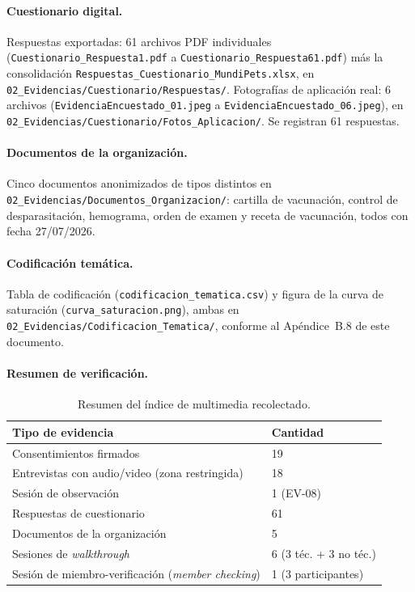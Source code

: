 \documentclass[journal,onecolumn]{IEEEtran}
\begin{document}
	\paragraph{Cuestionario digital.}
	Respuestas exportadas: 61 archivos PDF individuales
	(\texttt{Cuestionario\_Respuesta1.pdf} a
	\texttt{Cuestionario\_Respuesta61.pdf}) más la consolidación
	\texttt{Respuestas\_Cuestionario\_MundiPets.xlsx}, en
	\texttt{02\_Evidencias/Cuestionario/Respuestas/}. Fotografías de aplicación
	real: 6 archivos (\texttt{EvidenciaEncuestado\_01.jpeg} a
	\texttt{EvidenciaEncuestado\_06.jpeg}), en
	\texttt{02\_Evidencias/Cuestionario/Fotos\_Aplicacion/}. Se registran
	61 respuestas.
	
	\paragraph{Documentos de la organización.}
	Cinco documentos anonimizados de tipos distintos en
	\texttt{02\_Evidencias/Documentos\_Organizacion/}: cartilla de vacunación,
	control de desparasitación, hemograma, orden de examen y receta de
	vacunación, todos con fecha 27/07/2026.
	
	\paragraph{Codificación temática.}
	Tabla de codificación (\texttt{codificacion\_tematica.csv}) y figura de la
	curva de saturación (\texttt{curva\_saturacion.png}), ambas en
	\texttt{02\_Evidencias/Codificacion\_Tematica/}, conforme al
	Apéndice~B.8 de este documento.
	
	\paragraph{Resumen de verificación.}
	
	\begin{table}[H]
		\centering
		\small
		\caption{Resumen del índice de multimedia recolectado.}
		\label{tab:resumen-verificacion-mm}
		\begin{tabularx}{\textwidth}{@{}X l@{}}
			\toprule
			\textbf{Tipo de evidencia} & \textbf{Cantidad} \\
			\midrule
			Consentimientos firmados & 19 \\
			Entrevistas con audio/video (zona restringida) & 18 \\
			Sesión de observación & 1 (EV-08) \\
			Respuestas de cuestionario & 61 \\
			Documentos de la organización & 5 \\
			Sesiones de \emph{walkthrough} & 6 (3 téc. + 3 no téc.) \\
			Sesión de miembro-verificación (\emph{member checking}) & 1 (3 participantes) \\
			\bottomrule
		\end{tabularx}
	\end{table}
	
\end{document}
